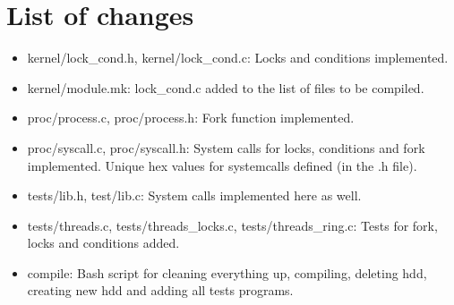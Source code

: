 \documentclass[11pt,a4paper]{article}
\begin{document}
\section{List of changes}

\begin{itemize}
\item kernel/lock\_cond.h, kernel/lock\_cond.c: Locks and conditions
implemented.
\item kernel/module.mk: lock\_cond.c added to the list of files to be compiled.
\item proc/process.c, proc/process.h: Fork function implemented.
\item proc/syscall.c, proc/syscall.h: System calls for locks, conditions and
fork implemented. Unique hex values for systemcalls defined (in the .h file).
\item tests/lib.h, test/lib.c: System calls implemented here as well.
\item tests/threads.c, tests/threads\_locks.c, tests/threads\_ring.c: Tests for
fork, locks and conditions added.
\item compile: Bash script for cleaning everything up, compiling, deleting hdd,
creating new hdd and adding all tests programs.
\end{itemize}
\end{document}
